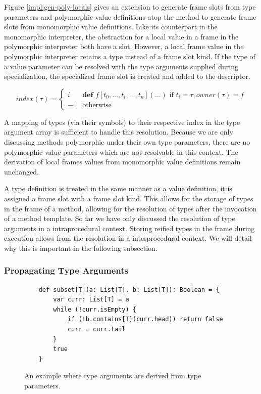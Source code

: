 Figure \ref{impl:gen-poly-locals} gives an extension to generate frame slots from type parameters and polymorphic value definitions atop the method to generate frame slots from monomorphic value definitions.
Like its counterpart in the monomorphic interpreter, the abstraction for a local value in a frame in the polymorphic interpreter both have a slot.
However, a local frame value in the polymorphic interpreter retains a type instead of a frame slot kind.
If the type of a value parameter can be resolved with the type arguments supplied during specialization, the specialized frame slot is created and added to the descriptor.

$$
index(\tau) = 
\begin{cases}
	i  & \textbf{def } f[t_0, \ldots, t_i, \ldots, t_n](\ldots) \text{ if } t_i = \tau, owner(\tau)=f \\
	-1 & \text{otherwise}
\end{cases}
$$

A mapping of types (via their symbols) to their respective index in the type argument array is sufficient to handle this resolution.
Because we are only discussing methods polymorphic under their own type parameters, there are no polymorphic value parameters which are not resolvable in this context.
The derivation of local frames values from monomorphic value definitions remain unchanged. 

A type definition is treated in the same manner as a value definition, it is assigned a frame slot with a  frame slot kind.
This allows for the storage of types in the frame of a method, allowing for the resolution of types after the invocation of a method template.
So far we have only discussed the resolution of type arguments in a intraprocedural context.
Storing reified types in the frame during execution allows from the resolution in a interprocedural context.
We will detail why this is important in the following subsection.

\subsubsection*{Propagating Type Arguments}

\begin{figure}[!htb]
	\begin{verbatim}
	def subset[T](a: List[T], b: List[T]): Boolean = {
		var curr: List[T] = a
		while (!curr.isEmpty) {
			if (!b.contains[T](curr.head)) return false
			curr = curr.tail
		}
		true 
	}
	\end{verbatim}
	\caption{An example where type arguments are derived from type parameters.}
	\label{impl:list-subset}
\end{figure}

